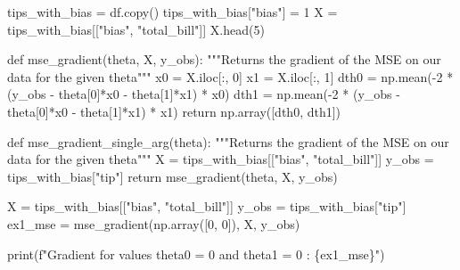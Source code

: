 \documentclass[
  letterpaper,
  DIV=11,
  numbers=noendperiod]{scrreprt}
\newenvironment{Shaded}{\begin{snugshade}}{\end{snugshade}}
\newcommand{\BuiltInTok}[1]{\textcolor[rgb]{0.00,0.23,0.31}{#1}}
\newcommand{\CommentTok}[1]{\textcolor[rgb]{0.37,0.37,0.37}{#1}}
\newcommand{\ControlFlowTok}[1]{\textcolor[rgb]{0.00,0.23,0.31}{#1}}
\newcommand{\DecValTok}[1]{\textcolor[rgb]{0.68,0.00,0.00}{#1}}
\newcommand{\KeywordTok}[1]{\textcolor[rgb]{0.00,0.23,0.31}{#1}}
\newcommand{\NormalTok}[1]{\textcolor[rgb]{0.00,0.23,0.31}{#1}}
\newcommand{\OperatorTok}[1]{\textcolor[rgb]{0.37,0.37,0.37}{#1}}
\newcommand{\SpecialCharTok}[1]{\textcolor[rgb]{0.37,0.37,0.37}{#1}}
\newcommand{\SpecialStringTok}[1]{\textcolor[rgb]{0.13,0.47,0.30}{#1}}
\newcommand{\StringTok}[1]{\textcolor[rgb]{0.13,0.47,0.30}{#1}}
\begin{document}
\begin{Shaded}
\begin{Highlighting}[]
\NormalTok{tips\_with\_bias }\OperatorTok{=}\NormalTok{ df.copy()}
\NormalTok{tips\_with\_bias[}\StringTok{"bias"}\NormalTok{] }\OperatorTok{=} \DecValTok{1}
\NormalTok{X }\OperatorTok{=}\NormalTok{ tips\_with\_bias[[}\StringTok{"bias"}\NormalTok{, }\StringTok{"total\_bill"}\NormalTok{]]}
\NormalTok{X.head(}\DecValTok{5}\NormalTok{)}

\KeywordTok{def}\NormalTok{ mse\_gradient(theta, X, y\_obs):}
    \CommentTok{"""Returns the gradient of the MSE on our data for the given theta"""}    
\NormalTok{    x0 }\OperatorTok{=}\NormalTok{ X.iloc[:, }\DecValTok{0}\NormalTok{]}
\NormalTok{    x1 }\OperatorTok{=}\NormalTok{ X.iloc[:, }\DecValTok{1}\NormalTok{]}
\NormalTok{    dth0 }\OperatorTok{=}\NormalTok{ np.mean(}\OperatorTok{{-}}\DecValTok{2} \OperatorTok{*}\NormalTok{ (y\_obs }\OperatorTok{{-}}\NormalTok{ theta[}\DecValTok{0}\NormalTok{]}\OperatorTok{*}\NormalTok{x0 }\OperatorTok{{-}}\NormalTok{ theta[}\DecValTok{1}\NormalTok{]}\OperatorTok{*}\NormalTok{x1) }\OperatorTok{*}\NormalTok{ x0)}
\NormalTok{    dth1 }\OperatorTok{=}\NormalTok{ np.mean(}\OperatorTok{{-}}\DecValTok{2} \OperatorTok{*}\NormalTok{ (y\_obs }\OperatorTok{{-}}\NormalTok{ theta[}\DecValTok{0}\NormalTok{]}\OperatorTok{*}\NormalTok{x0 }\OperatorTok{{-}}\NormalTok{ theta[}\DecValTok{1}\NormalTok{]}\OperatorTok{*}\NormalTok{x1) }\OperatorTok{*}\NormalTok{ x1)}
    \ControlFlowTok{return}\NormalTok{ np.array([dth0, dth1])}

\KeywordTok{def}\NormalTok{ mse\_gradient\_single\_arg(theta):}
    \CommentTok{"""Returns the gradient of the MSE on our data for the given theta"""}
\NormalTok{    X }\OperatorTok{=}\NormalTok{ tips\_with\_bias[[}\StringTok{"bias"}\NormalTok{, }\StringTok{"total\_bill"}\NormalTok{]]}
\NormalTok{    y\_obs }\OperatorTok{=}\NormalTok{ tips\_with\_bias[}\StringTok{"tip"}\NormalTok{]}
    \ControlFlowTok{return}\NormalTok{ mse\_gradient(theta, X, y\_obs)}

\NormalTok{X }\OperatorTok{=}\NormalTok{ tips\_with\_bias[[}\StringTok{"bias"}\NormalTok{, }\StringTok{"total\_bill"}\NormalTok{]]}
\NormalTok{y\_obs }\OperatorTok{=}\NormalTok{ tips\_with\_bias[}\StringTok{"tip"}\NormalTok{]}
\NormalTok{ex1\_mse }\OperatorTok{=}\NormalTok{ mse\_gradient(np.array([}\DecValTok{0}\NormalTok{, }\DecValTok{0}\NormalTok{]), X, y\_obs)}

\BuiltInTok{print}\NormalTok{(}\SpecialStringTok{f"Gradient for values theta0 = 0 and theta1 = 0 : }\SpecialCharTok{\{}\NormalTok{ex1\_mse}\SpecialCharTok{\}}\SpecialStringTok{"}\NormalTok{)}
\end{Highlighting}
\end{Shaded}
\end{document}
